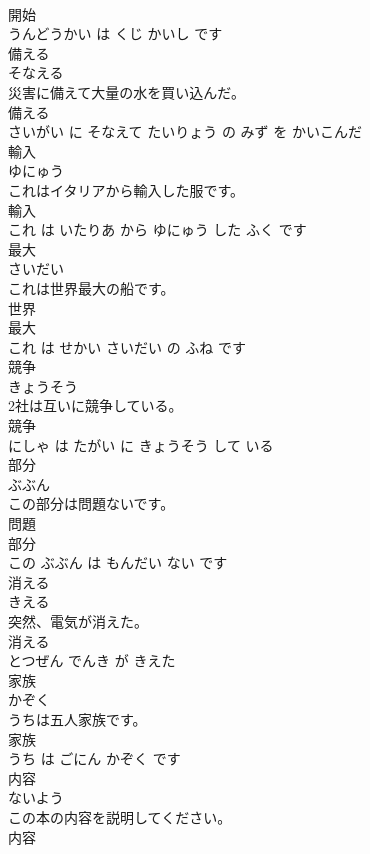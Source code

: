 \documentclass[8pt]{extreport}
\begin{document}
\begin{CJK}{UTF8}{min}
\\	開始 
\\	うんどうかい は くじ かいし です			
\\	備える	
\\	そなえる			
\\	災害に備えて大量の水を買い込んだ。	
\\	備える 
\\	さいがい に そなえて たいりょう の みず を かいこんだ			
\\	輸入	
\\	ゆにゅう			
\\	これはイタリアから輸入した服です。	
\\	輸入 
\\	これ は いたりあ から ゆにゅう した ふく です			
\\	最大	
\\	さいだい			
\\	これは世界最大の船です。	
\\	世界 
\\	最大 
\\	これ は せかい さいだい の ふね です			
\\	競争	
\\	きょうそう			
\\	2社は互いに競争している。	
\\	競争 
\\	にしゃ は たがい に きょうそう して いる			
\\	部分	
\\	ぶぶん			
\\	この部分は問題ないです。	
\\	問題 
\\	部分 
\\	この ぶぶん は もんだい ない です			
\\	消える	
\\	きえる			
\\	突然、電気が消えた。	
\\	消える 
\\	とつぜん でんき が きえた			
\\	家族	
\\	かぞく			
\\	うちは五人家族です。	
\\	家族 
\\	うち は ごにん かぞく です			
\\	内容	
\\	ないよう			
\\	この本の内容を説明してください。	
\\	内容 

\end{CJK}
\end{document}
